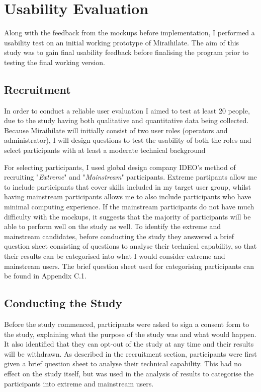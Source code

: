 \chapter{Usability Evaluation}

Along with the feedback from the mockups before implementation, I performed a usability test on an initial working prototype of Miraihilate. The aim of this study was to gain final usability feedback before finalising the program prior to testing the final working version.

\section{Recruitment}

In order to conduct a reliable user evaluation I aimed to test at least 20 people, due to the study having both qualitative and quantitative data being collected. Because Miraihilate will initially consist of two user roles (operators and administrator), I will design questions to test the usability of both the roles and select participants with at least a moderate technical background

\vspace{0.5cm}

For selecting participants, I used global design company IDEO's method of recruiting "\textit{Extreme}" and "\textit{Mainstream}" participants. Extreme partipants allow me to include participants that cover skills included in my target user group, whilst having mainstream participants allows me to also include participants who have minimal computing experience. If the mainstream participants do not have much difficulty with the mockups, it suggests that the majority of participants will be able to perform well on the study as well. To identify the extreme and mainstream candidates, before conducting the study they answered a brief question sheet consisting of questions to analyse their technical capability, so that their results can be categorised into what I would consider extreme and mainstream users. The brief question sheet used for categorising participants can be found in Appendix C.1.

\section{Conducting the Study}

Before the study commenced, participants were asked to sign a consent form to the study, explaining what the purpose of the study was and what would happen. It also identified that they can opt-out of the study at any time and their results will be withdrawn.
As described in the recruitment section, participants were first given a brief question sheet to analyse their technical capability. This had no effect on the study itself, but was used in the analysis of results to categorise the participants into extreme and mainstream users.

